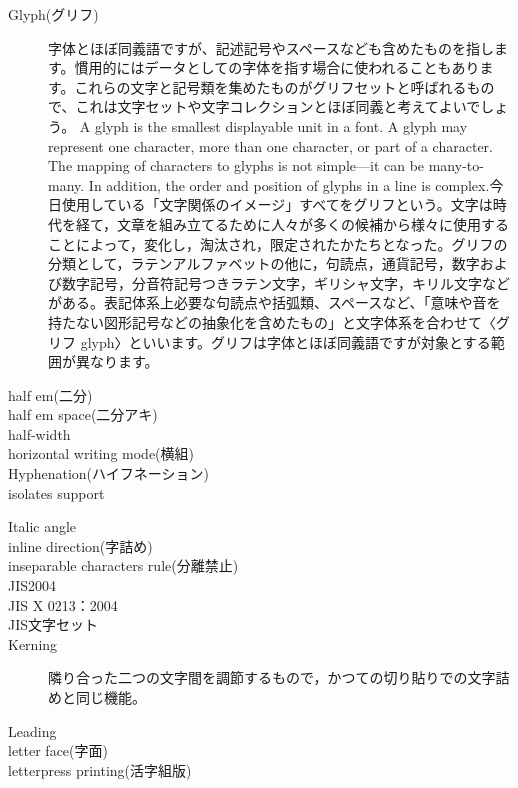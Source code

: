\begin{description}
    \item[Glyph(グリフ)]字体とほぼ同義語ですが、記述記号やスペースなども含めたものを指します。慣用的にはデータとしての字体を指す場合に使われることもあります。これらの文字と記号類を集めたものがグリフセットと呼ばれるもので、これは文字セットや文字コレクションとほぼ同義と考えてよいでしょう。 A glyph is the smallest displayable unit in a font. A glyph may represent one character, more than one character, or part of a character. The mapping of characters to glyphs is not simple—it can be many-to-many. In addition, the order and position of glyphs in a line is complex\cite{developer.apple.com:library/archive/documentation/MacOSX/Conceptual/BPInternational/InternationalizingYourCode/InternationalizingYourCode.html}.今日使用している「文字関係のイメージ」すべてをグリフという。文字は時代を経て，文章を組み立てるために人々が多くの候補から様々に使用することによって，変化し，淘汰され，限定されたかたちとなった。グリフの分類として，ラテンアルファベットの他に，句読点，通貨記号，数字および数字記号，分音符記号つきラテン文字，ギリシャ文字，キリル文字などがある\cite{handbook_of_typography}。表記体系上必要な句読点や括弧類、スペースなど、「意味や音を持たない図形記号などの抽象化を含めたもの」と文字体系を合わせて〈グリフ glyph〉といいます。グリフは字体とほぼ同義語ですが対象とする範囲が異なります\cite{introduction_to_japanese_typesetting}。
    \item[half em(二分)]
    \item[half em space(二分アキ)]
    \item[half-width]
    \item[horizontal writing mode(横組)]
    \item[Hyphenation(ハイフネーション)]
    \item[isolates support]\cite{developer.apple.com:videos/play/wwdc2016/232/}
    \item[Italic angle]
    \item[inline direction(字詰め)]
    \item[inseparable characters rule(分離禁止)]
    \item[JIS2004]
    \item[JIS X 0213：2004]
    \item[JIS文字セット]
    \item[Kerning]隣り合った二つの文字間を調節するもので，かつての切り貼りでの文字詰めと同じ機能\cite{handbook_of_typography}。
    \item[Leading]
    \item[letter face(字面)]
    \item[letterpress printing(活字組版)]

\end{description}
